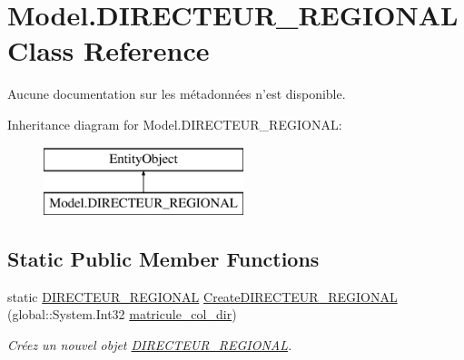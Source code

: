 \hypertarget{class_model_1_1_d_i_r_e_c_t_e_u_r___r_e_g_i_o_n_a_l}{\section{Model.\-D\-I\-R\-E\-C\-T\-E\-U\-R\-\_\-\-R\-E\-G\-I\-O\-N\-A\-L Class Reference}
\label{class_model_1_1_d_i_r_e_c_t_e_u_r___r_e_g_i_o_n_a_l}
}


Aucune documentation sur les métadonnées n'est disponible.  


Inheritance diagram for Model.\-D\-I\-R\-E\-C\-T\-E\-U\-R\-\_\-\-R\-E\-G\-I\-O\-N\-A\-L\-:\begin{figure}[H]
\begin{center}
\leavevmode
\includegraphics[height=2.000000cm]{class_model_1_1_d_i_r_e_c_t_e_u_r___r_e_g_i_o_n_a_l}
\end{center}
\end{figure}
\subsection*{Static Public Member Functions}
\begin{DoxyCompactItemize}
\item 
static \hyperlink{class_model_1_1_d_i_r_e_c_t_e_u_r___r_e_g_i_o_n_a_l}{D\-I\-R\-E\-C\-T\-E\-U\-R\-\_\-\-R\-E\-G\-I\-O\-N\-A\-L} \hyperlink{class_model_1_1_d_i_r_e_c_t_e_u_r___r_e_g_i_o_n_a_l_a819f70c009cbf1e34a0e7fb9d48ed221}{Create\-D\-I\-R\-E\-C\-T\-E\-U\-R\-\_\-\-R\-E\-G\-I\-O\-N\-A\-L} (global\-::\-System.\-Int32 \hyperlink{class_model_1_1_d_i_r_e_c_t_e_u_r___r_e_g_i_o_n_a_l_af8f929e9e0dd4f9a73d90d9f234a83d2}{matricule\-\_\-col\-\_\-dir})
\begin{DoxyCompactList}\small\item\em Créez un nouvel objet \hyperlink{class_model_1_1_d_i_r_e_c_t_e_u_r___r_e_g_i_o_n_a_l}{D\-I\-R\-E\-C\-T\-E\-U\-R\-\_\-\-R\-E\-G\-I\-O\-N\-A\-L}. \end{DoxyCompactList}\end{DoxyCompactItemize}
